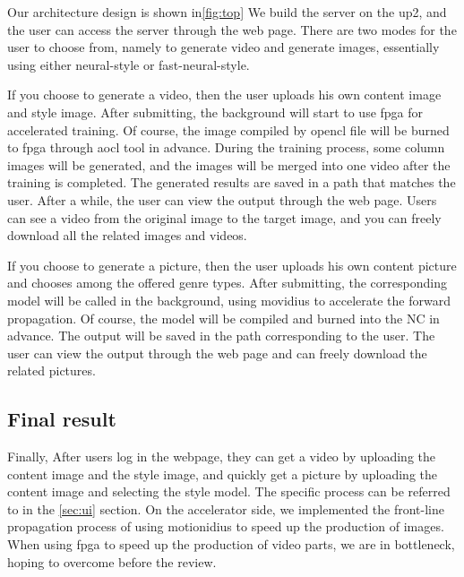 Our architecture design is shown in\ref{fig:top} We build the server on the up2, and the user can access the server through the web page.
There are two modes for the user to choose from, namely to generate video and generate images, essentially using either neural-style or fast-neural-style.

If you choose to generate a video, then the user uploads his own content image and style image.
After submitting, the background will start to use fpga for accelerated training. Of course, the image compiled by opencl file will be burned to fpga through aocl tool in advance.
During the training process, some column images will be generated, and the images will be merged into one video after the training is completed.
The generated results are saved in a path that matches the user. After a while, the user can view the output through the web page.
Users can see a video from the original image to the target image, and you can freely download all the related images and videos.

If you choose to generate a picture, then the user uploads his own content picture and chooses among the offered genre types.
After submitting, the corresponding model will be called in the background, using movidius to accelerate the forward propagation. Of course, the model will be compiled and burned into the NC in advance.
The output will be saved in the path corresponding to the user. The user can view the output through the web page and can freely download the related pictures.
\subsection{Final result}
Finally, After users log in the webpage, they can get a video by uploading the content image and the style image, and quickly get a picture by uploading the content image and selecting the style model.
The specific process can be referred to in the \ref{sec:ui} section.
On the accelerator side, we implemented the front-line propagation process of using motionidius to speed up the production of images.
When using fpga to speed up the production of video parts, we are in bottleneck, hoping to overcome before the review.
